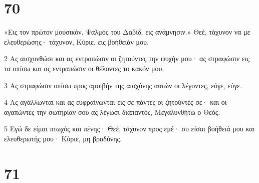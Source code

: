 \chapter{70}

\par «Εις τον πρώτον μουσικόν. Ψαλμός του Δαβίδ, εις ανάμνησιν.» Θεέ, τάχυνον να με ελευθερώσης· τάχυνον, Κύριε, εις βοήθειάν μου.
\par 2 Ας αισχυνθώσι και ας εντραπώσιν οι ζητούντες την ψυχήν μου· ας στραφώσιν εις τα οπίσω και ας εντραπώσιν οι θέλοντες το κακόν μου.
\par 3 Ας στραφώσιν οπίσω προς αμοιβήν της αισχύνης αυτών οι λέγοντες, εύγε, εύγε.
\par 4 Ας αγάλλωνται και ας ευφραίνωνται εις σε πάντες οι ζητούντές σε· και οι αγαπώντες την σωτηρίαν σου ας λέγωσι διαπαντός, Μεγαλυνθήτω ο Θεός.
\par 5 Εγώ δε είμαι πτωχός και πένης· Θεέ, τάχυνον προς εμέ· συ είσαι βοήθειά μου και ελευθερωτής μου· Κύριε, μη βραδύνης.

\chapter{71}

